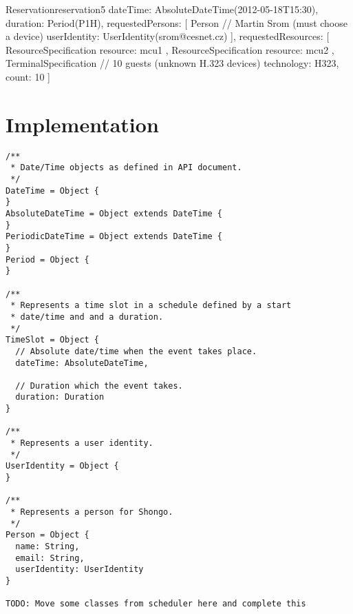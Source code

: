 \begin{enumerate}
\begin{EntityExample}{Reservation}{reservation5}{}
dateTime: AbsoluteDateTime(2012-05-18T15:30), duration: Period(P1H),
requestedPersons: [
  Person { // Martin Srom (must choose a device)
    userIdentity: UserIdentity(srom@cesnet.cz)
  }
],
requestedResources: [
  ResourceSpecification {
    resource: mcu1
  },
  ResourceSpecification {
    resource: mcu2
  },
  TerminalSpecification { // 10 guests (unknown H.323 devices)
    technology: H323,
    count: 10
  }
]
\end{EntityExample}

\end{enumerate}


\section{Implementation}

\CodeStyle{}
\CodeStyleAppendLanguage

\begin{lstlisting}
/**
 * Date/Time objects as defined in API document.
 */
DateTime = Object {
}
AbsoluteDateTime = Object extends DateTime {
}
PeriodicDateTime = Object extends DateTime {
}
Period = Object {
}

/**
 * Represents a time slot in a schedule defined by a start 
 * date/time and and a duration.
 */
TimeSlot = Object {
  // Absolute date/time when the event takes place.
  dateTime: AbsoluteDateTime,

  // Duration which the event takes.
  duration: Duration
}

/** 
 * Represents a user identity.
 */
UserIdentity = Object {
}

/**
 * Represents a person for Shongo.
 */
Person = Object {
  name: String,
  email: String,
  userIdentity: UserIdentity
}

TODO: Move some classes from scheduler here and complete this
\end{lstlisting}